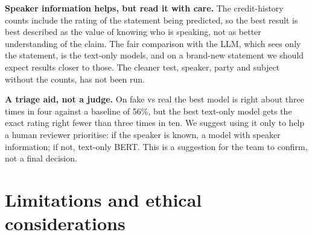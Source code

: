 \documentclass[10pt,a4paper,twoside]{article}
\begin{document}
\textbf{Speaker information helps, but read it with care.} The credit-history counts include the rating of the statement being predicted, so the best result is best described as the value of knowing who is speaking, not as better understanding of the claim. The fair comparison with the LLM, which sees only the statement, is the text-only models, and on a brand-new statement we should expect results closer to those. The cleaner test, speaker, party and subject without the counts, has not been run.

\textbf{A triage aid, not a judge.} On fake vs real the best model is right about three times in four against a baseline of 56\%, but the best text-only model gets the exact rating right fewer than three times in ten. We suggest using it only to help a human reviewer prioritise: if the speaker is known, a model with speaker information; if not, text-only BERT. This is a suggestion for the team to confirm, not a final decision.

\section{Limitations and ethical considerations}
\end{document}
